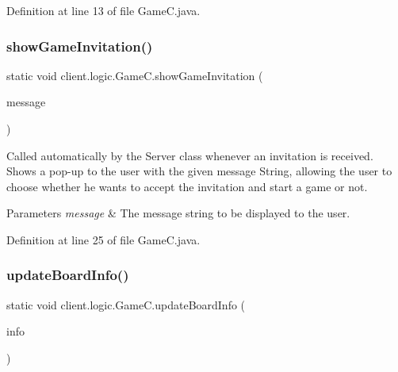 Definition at line 13 of file Game\+C.\+java.

\hypertarget{classclient_1_1logic_1_1_game_c_a62c530e593e489903a8ab6557763be27}{}\label{classclient_1_1logic_1_1_game_c_a62c530e593e489903a8ab6557763be27} 
\subsubsection{\texorpdfstring{show\+Game\+Invitation()}{showGameInvitation()}}
{\footnotesize\ttfamily static void client.\+logic.\+Game\+C.\+show\+Game\+Invitation (\begin{DoxyParamCaption}\item[{String}]{message }\end{DoxyParamCaption})\hspace{0.3cm}{\ttfamily [static]}}

Called automatically by the {\ttfamily Server} class whenever an invitation is received. Shows a pop-\/up to the user with the given message String, allowing the user to choose whether he wants to accept the invitation and start a game or not.


\begin{DoxyParams}{Parameters}
{\em message} & The message string to be displayed to the user. \\
\hline
\end{DoxyParams}


Definition at line 25 of file Game\+C.\+java.

\hypertarget{classclient_1_1logic_1_1_game_c_a336eb8b84428bb738e4760e992d04997}{}\label{classclient_1_1logic_1_1_game_c_a336eb8b84428bb738e4760e992d04997} 
\subsubsection{\texorpdfstring{update\+Board\+Info()}{updateBoardInfo()}}
{\footnotesize\ttfamily static void client.\+logic.\+Game\+C.\+update\+Board\+Info (\begin{DoxyParamCaption}\item[{\hyperlink{classsharedlib_1_1tuples_1_1_board_info}{Board\+Info}}]{info }\end{DoxyParamCaption})\hspace{0.3cm}{\ttfamily [static]}}

